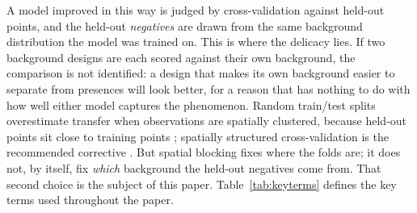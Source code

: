 \documentclass[12pt]{article}
\begin{document}
A model improved in this way is judged by cross-validation against held-out points, and the held-out \emph{negatives} are drawn from the same background distribution the model was trained on.
This is where the delicacy lies.
If two background designs are each scored against their own background, the comparison is not identified: a design that makes its own background easier to separate from presences will look better, for a reason that has nothing to do with how well either model captures the phenomenon.
Random train/test splits overestimate transfer when observations are spatially clustered, because held-out points sit close to training points \citep{hijmans2012, roberts2017}; spatially structured cross-validation is the recommended corrective \citep{valavi2019}.
But spatial blocking fixes where the folds are; it does not, by itself, fix \emph{which} background the held-out negatives come from.
That second choice is the subject of this paper.
Table~\ref{tab:keyterms} defines the key terms used throughout the paper.
\end{document}
